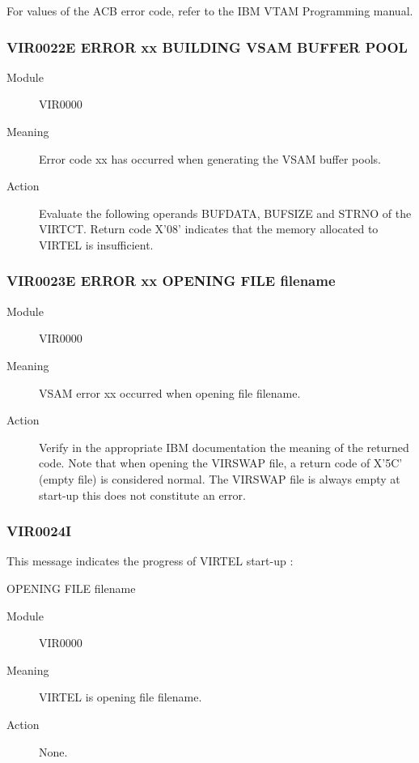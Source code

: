 \documentclass[letterpaper,10pt,english]{sphinxmanual}
\begin{document}
For values of the ACB error code, refer to the IBM VTAM Programming manual.


\subsubsection{VIR0022E ERROR xx BUILDING VSAM BUFFER POOL}
\label{\detokenize{messages:vir0022e-error-xx-building-vsam-buffer-pool}}\begin{description}
\item[{Module}] \leavevmode
VIR0000

\item[{Meaning}] \leavevmode
Error code xx has occurred when generating the VSAM buffer pools.

\item[{Action}] \leavevmode
Evaluate the following operands BUFDATA, BUFSIZE and STRNO of the VIRTCT. Return code X’08’ indicates that the memory allocated to VIRTEL is insufficient.

\end{description}


\subsubsection{VIR0023E ERROR xx OPENING FILE filename}
\label{\detokenize{messages:vir0023e-error-xx-opening-file-filename}}\begin{description}
\item[{Module}] \leavevmode
VIR0000

\item[{Meaning}] \leavevmode
VSAM error xx occurred when opening file filename.

\item[{Action}] \leavevmode
Verify in the appropriate IBM documentation the meaning of the returned code. Note that when opening the VIRSWAP file, a return code of X’5C’ (empty file) is considered normal. The VIRSWAP file is always empty at start-up this does not constitute an error.

\end{description}


\subsubsection{VIR0024I}
\label{\detokenize{messages:vir0024i}}
This message indicates the progress of VIRTEL start-up :

OPENING FILE filename
\begin{description}
\item[{Module}] \leavevmode
VIR0000

\item[{Meaning}] \leavevmode
VIRTEL is opening file filename.

\item[{Action}] \leavevmode
None.

\end{description}
\end{document}
